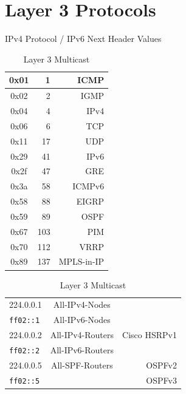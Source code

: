 \documentclass[12pt]{article}
\begin{document}
\section{Layer 3 Protocols \label{sec:L3}}
	\begin{table}[H]
	\begin{minipage}{.35\linewidth}
	\centering
	\caption{IPv4 Protocol / IPv6 Next Header Values \label{tab:L3 PROTOCOL}}
	\begin{tabular}{| >{\ttfamily}c | r | r |}\hline
	0x01	& 1			& ICMP\\\hline
	0x02	& 2			& IGMP\\\hline
	0x04	& 4			& IPv4\\\hline
	0x06	& 6			& TCP\\\hline
	0x11	& 17			& UDP\\\hline
	0x29	& 41			& IPv6\\\hline
	0x2f	& 47			& GRE\\\hline
	0x3a 	& 58			& ICMPv6\\\hline
	0x58	& 88			& EIGRP\\\hline
	0x59	& 89			& OSPF\\\hline
	0x67	& 103			& PIM\\\hline
	0x70	& 112			& VRRP\\\hline
	0x89	& 137			& MPLS-in-IP\\\hline
	\end{tabular}\end{minipage}%
	\begin{minipage}{.6\linewidth}
	\centering
	\caption{Layer 3 Multicast \label{tab:MULTICAST L3}}
	\begin{tabular}{| l | c | r |}\hline
	224.0.0.1		& All-IPv4-Nodes		&\\
	\texttt{ff02::1}	& All-IPv6-Nodes		&\\\hline
	224.0.0.2		& All-IPv4-Routers	& Cisco HSRPv1\\
	\texttt{ff02::2}	& All-IPv6-Routers	&\\\hline
	224.0.0.5		& All-SPF-Routers	& OSPFv2\\
	\texttt{ff02::5}	&				& OSPFv3\\\hline

\end{tabular}
\end{minipage}
\end{table}
\end{document}
